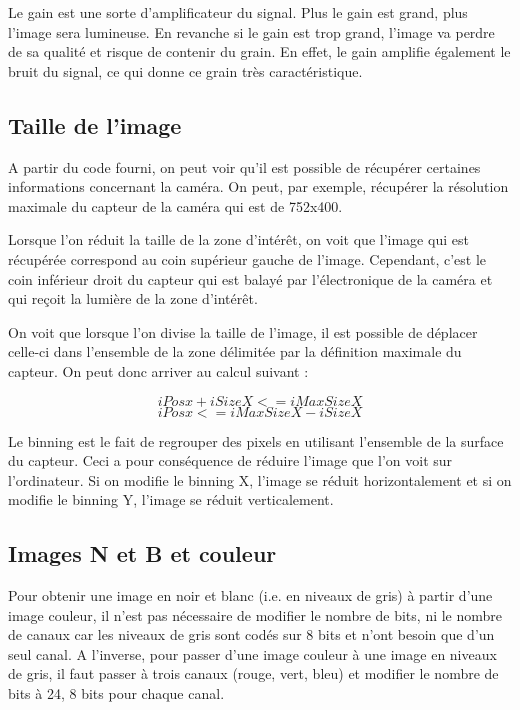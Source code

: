 Le gain est une sorte d'amplificateur du signal. Plus le gain est grand, plus l'image sera lumineuse.
En revanche si le gain est trop grand, l'image va perdre de sa qualité et risque de contenir du grain. En effet, le gain amplifie également le bruit du signal, ce qui donne ce grain très caractéristique.\newline

\subsection{Taille de l'image}

A partir du code fourni, on peut voir qu'il est possible de récupérer certaines informations concernant la caméra.
On peut, par exemple, récupérer la résolution maximale du capteur de la caméra qui est de 752x400.\newline

Lorsque l'on réduit la taille de la zone d'intérêt, on voit que l'image qui est récupérée correspond au coin supérieur
gauche de l'image. Cependant, c'est le coin inférieur droit du capteur qui est balayé par l'électronique de la caméra 
et qui reçoit la lumière de la zone d'intérêt.\newline

On voit que lorsque l'on divise la taille de l'image, il est possible de déplacer celle-ci dans l'ensemble de la zone 
délimitée par la définition maximale du capteur. On peut donc arriver au calcul suivant : 
\begin{framed}
$$ iPosx + iSizeX <= iMaxSizeX$$
$$ iPosx <= iMaxSizeX - iSizeX$$
\end{framed}

Le binning est le fait de regrouper des pixels en utilisant l'ensemble de la surface du capteur. Ceci a pour conséquence
de réduire l'image que l'on voit sur l'ordinateur. Si on modifie le binning X, l'image se réduit horizontalement et 
si on modifie le binning Y, l'image se réduit verticalement.\newline


\subsection{Images N et B et couleur}

Pour obtenir une image en noir et blanc (i.e. en niveaux de gris) à partir d'une image couleur, il n'est pas nécessaire de modifier le nombre de bits, ni
le nombre de canaux car les niveaux de gris sont codés sur 8 bits et n'ont besoin que d'un seul canal. A l'inverse, pour passer d'une image couleur à une image en niveaux de gris,
il faut passer à trois canaux (rouge, vert, bleu) et modifier le nombre de bits à 24, 8 bits pour chaque canal.\\

